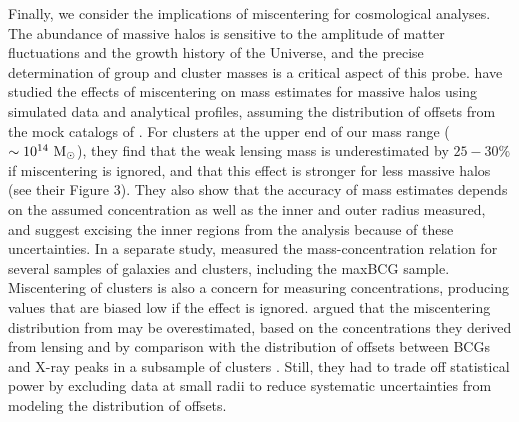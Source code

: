 Finally, we consider the implications of miscentering for cosmological
analyses. The abundance of massive halos is sensitive to the amplitude
of matter fluctuations and the growth history of the Universe, and the
precise determination of group and cluster masses is a critical aspect
of this probe. \citet{Mandelbaum2010} have studied the effects of
miscentering on mass estimates for massive halos using simulated data
and analytical profiles, assuming the distribution of offsets from the
mock catalogs of \citet{Johnston2007b}. For clusters at the upper end
of our mass range ($\sim10^{14}~\rm{M}_{\odot}$), they find that the
weak lensing mass is underestimated by $25-30\%$ if miscentering is
ignored, and that this effect is stronger for less massive halos (see
their Figure 3). They also show that the accuracy of mass estimates
depends on the assumed concentration as well as the inner and outer
radius measured, and suggest excising the inner regions from the
analysis because of these uncertainties. In a separate study,
\citet{Mandelbaum2008} measured the mass-concentration relation for
several samples of galaxies and clusters, including the maxBCG
sample. Miscentering of clusters is also a concern for measuring
concentrations, producing values that are biased low if the effect is
ignored. \citet{Mandelbaum2008} argued that the miscentering
distribution from \citet{Johnston2007b} may be overestimated, based on
the concentrations they derived from lensing and by comparison with the
distribution of offsets between BCGs and X-ray peaks in a subsample of
clusters \citep{Koester2007b}. Still, they had to trade off statistical
power by excluding data at small radii to reduce systematic
uncertainties from modeling the distribution of offsets.

